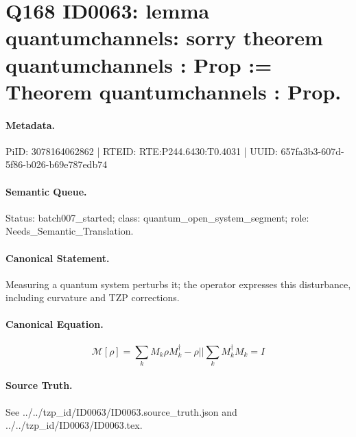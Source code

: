 \section*{Q168 ID0063: lemma quantumchannels: sorry theorem quantumchannels : Prop := Theorem quantumchannels : Prop.}
\paragraph{Metadata.}
PiID: 3078164062862 | RTEID: RTE:P244.6430:T0.4031 | UUID: 657fa3b3-607d-5f86-b026-b69e787edb74

\paragraph{Semantic Queue.}
Status: batch007\_started; class: quantum\_open\_system\_segment; role: Needs\_Semantic\_Translation.

\paragraph{Canonical Statement.}
Measuring a quantum system perturbs it; the operator expresses this disturbance, including curvature and TZP corrections.

\paragraph{Canonical Equation.}
\[
\mathcal{M}[\rho] = \sum_{k} M_{k}\rho M_{k}^{\dagger} - \rho || \sum_{k} M_{k}^{\dagger}M_{k} = I
\]

\paragraph{Source Truth.}
See ../../tzp\_id/ID0063/ID0063.source\_truth.json and ../../tzp\_id/ID0063/ID0063.tex.
